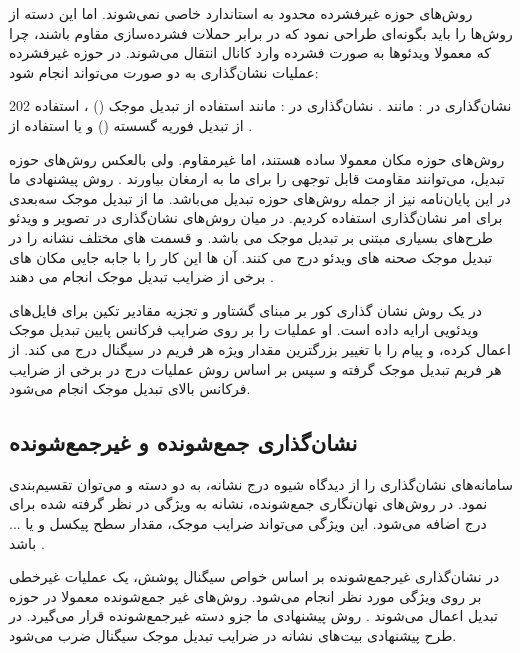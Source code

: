 روش‌های حوزه غیرفشرده محدود به استاندارد خاصی نمی‌شوند. اما این دسته از روش‌ها را باید بگونه‌ای طراحی نمود که در برابر حملات فشرده‌سازی مقاوم باشند، چرا که معمولا ویدئوها به صورت فشرده وارد کانال انتقال می‌شوند. در حوزه غیر‌فشرده عملیات نشان‌گذاری به دو صورت می‌تواند انجام شود:
\begin{dinglist}{202}
\mord{}
نشان‌گذاری در {}: مانند {\cite{Lancini2002,Mobasseri1998}}. 
\mord{}
نشان‌گذاری در {}: مانند استفاده از تبدیل موجک ({}) {\cite{Chan2003,Al-Taweel2010,Campisi2005,Reyes2010}}، استفاده از تبدیل فوریه گسسته 
({}) {\cite{Deguillaume1999}} و یا استفاده از {} {\cite{Swanson2002,Sun2010a}}.
\end{dinglist}
روش‌های حوزه مکان معمولا ساده هستند، اما غیرمقاوم. ولی بالعکس روش‌های حوزه تبدیل، می‌توانند مقاومت قابل توجهی را برای ما به ارمغان بیاورند {\cite{Abdallah2009}}. روش پیشنهادی ما در این پایان‌نامه نیز از جمله  روش‌های حوزه تبدیل می‌باشد. ما از تبدیل موجک سه‌بعدی برای امر نشان‌گذاری استفاده کردیم. در میان روش‌های نشان‌گذاری در تصویر و ویدئو طرح‌های بسیاری مبتنی بر تبدیل موجک می باشد. 
{} و {} قسمت های مختلف نشانه را در تبدیل موجک صحنه های ویدئو درج می کنند. آن ها این کار را با جابه جایی مکان های برخی از ضرایب تبدیل موجک انجام می دهند \cite{Chan2003}. 

{} در {\cite{Guo-juan2009}} یک روش نشان گذاری کور بر مبنای گشتاور {} و تجزیه مقادیر تکین برای فایل‌های ویدئویی ارایه داده است. او عملیات {} را بر روی ضرایب فرکانس پایین تبدیل موجک اعمال کرده، و پیام را با تغییر بزرگترین مقدار ویژه هر فریم در سیگنال درج می کند. {} از هر فریم تبدیل موجک گرفته و سپس بر اساس روش {} عملیات درج در برخی از ضرایب فرکانس بالای تبدیل موجک انجام می‌شود. 

\subsection{نشان‌گذاری جمع‌شونده و غیرجمع‌شونده}
سامانه‌های نشان‌گذاری را از دیدگاه شیوه درج نشانه، به دو دسته {} و {} می‌توان تقسیم‌بندی نمود. در روش‌های نهان‌نگاری جمع‌شونده، نشانه به ویژگی در نظر گرفته شده برای درج اضافه می‌شود. این ویژگی می‌تواند ضرایب موجک، مقدار سطح پیکسل و یا ... باشد {\cite{Motwani2010,Pu2010,Zhang2010a}}. 

در نشان‌گذاری غیرجمع‌شونده بر اساس خواص سیگنال پوشش، یک عملیات غیرخطی بر روی ویژگی مورد نظر انجام می‌شود. روش‌های غیر جمع‌شونده معمولا در حوزه تبدیل اعمال می‌شوند \cite{Cox2002}.  روش پیشنهادی ما جزو دسته غیرجمع‌شونده قرار می‌گیرد. در طرح پیشنهادی بیت‌های نشانه در ضرایب تبدیل موجک سیگنال ضرب می‌شود. 

